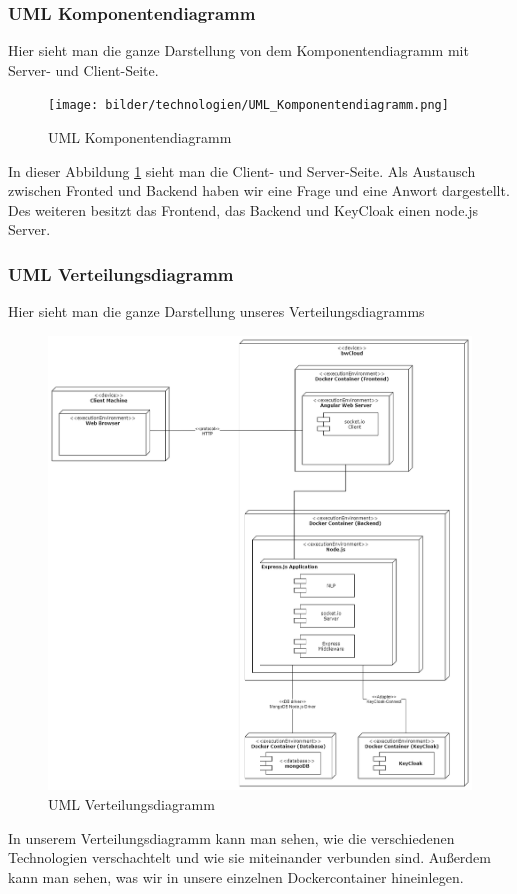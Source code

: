 \newpage

\subsubsection{UML Komponentendiagramm}
Hier sieht man die ganze Darstellung von dem Komponentendiagramm mit Server- und Client-Seite.
\begin{figure}[H]
    \centering
    \texttt{[image: bilder/technologien/UML\_Komponentendiagramm.png]}
    \caption{UML Komponentendiagramm}
    \label{fig:UML_Komponentendiagramm}
    \end{figure}
\noindent In dieser Abbildung \ref{fig:UML_Komponentendiagramm} sieht man die Client- und Server-Seite. 
Als Austausch zwischen Fronted und Backend haben wir eine Frage und eine Anwort dargestellt.
Des weiteren besitzt das Frontend, das Backend und KeyCloak einen node.js Server.

\newpage

\subsubsection{UML Verteilungsdiagramm}
Hier sieht man die ganze Darstellung unseres Verteilungsdiagramms
\begin{figure}[H]
\centering
\includegraphics[width=1.0\textwidth]{bilder/technologien/Verteilunsgdiagramm.png}
\caption{UML Verteilungsdiagramm}
\label{fig:UML_Verteilungsdiagramm}
\end{figure}
\noindent In unserem Verteilungsdiagramm kann man sehen, 
wie die verschiedenen Technologien verschachtelt und wie sie miteinander verbunden sind.
Außerdem kann man sehen, was wir in unsere einzelnen Dockercontainer hineinlegen.